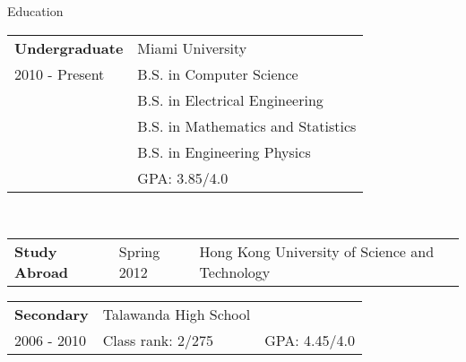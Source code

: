 \documentclass{resume} %
\begin{document}
\begin{rSection}{Education}
  \begin{tabular}{ll}
    \textbf{Undergraduate}    & Miami University \\
    2010 - Present   & B.S. in Computer Science \\
    & B.S. in Electrical Engineering \\
    & B.S. in Mathematics and Statistics \\
    & B.S. in Engineering Physics \\
    & GPA: 3.85/4.0 \\
  \end{tabular} \\
  \begin{tabular}{lll}
    \textbf{Study Abroad} & Spring 2012 &  Hong Kong University of Science and Technology   \\
  \end{tabular}

  \begin{tabular}{lll}
    \textbf{Secondary}    & Talawanda High School \\
    2006 - 2010           & Class rank: 2/275 & GPA: 4.45/4.0 \\
  \end{tabular} 
\end{rSection}
\end{document}
